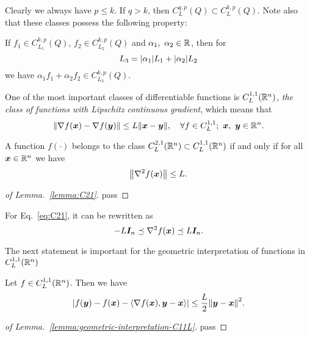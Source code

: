 Clearly we always have \(p \le k\). If \(q > k\), then \(C_L^{q, p}(Q) \subset C_{L}^{k, p}(Q)\). Note also that these classes possess the following property:

\begin{thm}\label{thm:add-property}
    If \(f_1 \in C^{k,p}_{L_1}(Q)\), \(f_2 \in C^{k,p}_{L_2}(Q)\) and \(\alpha_1,~\alpha_2 \in \mathbb{R}\), then for
    \[
        L_3 = \abs{\alpha_1} L_1 + \abs{\alpha_2} L_2  
    \]
    we have \(\alpha_1 f_1 + \alpha_2 f_2 \in C^{k, p}_{L_3}(Q)\).
\end{thm}

One of the most important classes of differentiable functions is \(C_L^{1, 1}(\mathbb{R}^n)\), \emph{the class of functions with Lipschitz continuous gradient}, which means that
\[
    \norm{\nabla f(\bm{x}) - \nabla f({\bm{y}})} \le L \norm{\bm{x} - \bm{y}}, \quad \forall f \in C_{L}^{1, 1};~\bm{x},~\bm{y} \in \mathbb{R}^n. 
\]

\begin{lemma}\label{lemma:C21}
    A function \(f(\cdot)\) belongs to the class \(C_L^{2, 1}(\mathbb{R}^n) \subset C_L^{1, 1}(\mathbb{R}^n)\)
    if and only if for all \(\bm{x} \in \mathbb{R}^n\) we have
    \begin{equation}\label{eq:C21}
        \norm{\hess f(\bm{x})} \le L.
    \end{equation}
\end{lemma}

\begin{proof}[of Lemma.~\ref{lemma:C21}]
    pass
\end{proof}

For Eq.~\ref{eq:C21}, it can be rewritten as
\begin{equation}
    -L \bm{I}_n \preceq \hess f(\bm{x}) \preceq L \bm{I}_n.
\end{equation}

The next statement is important for the geometric interpretation of functions in \(C_L^{1, 1}(\mathbb{R}^n)\)
\begin{lemma}\label{lemma:geometric-interpretation-C11L}
    Let \(f \in C_L^{1, 1}(\mathbb{R}^n)\). Then we have
    \begin{equation}
        \abs{f(\bm{y}) - f(\bm{x}) - \left\langle \nabla f(\bm{x}), \bm{y} - \bm{x} \right\rangle} \le \frac{L}{2} \norm{\bm{y} - \bm{x}}^2.
    \end{equation}
\end{lemma}

\begin{proof}[of Lemma.~\ref{lemma:geometric-interpretation-C11L}]
    pass
\end{proof}


